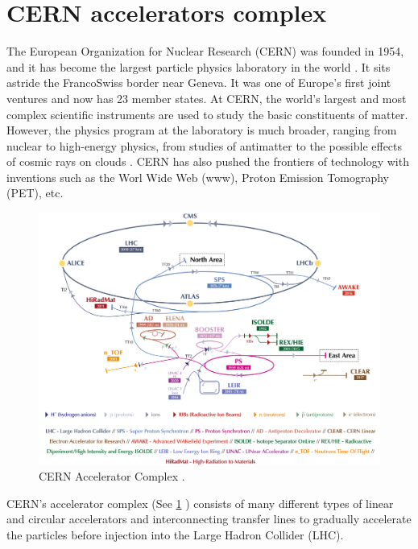 \pagestyle{fancy}

\graphicspath{ {Figures/Chapter1_Overview/} }

\section{CERN accelerators complex}
\label{sec:CERN_acc_complex}

The European Organization for Nuclear Research (CERN) was founded in 1954, and it has become the largest particle physics laboratory in the world \parencite*[][]{ref:CernWebsite}. It sits astride the FrancoSwiss border near Geneva. It was one of Europe's first joint ventures and now has 23 member states. At CERN, the world's largest and most complex scientific instruments are used to study the basic constituents of matter. However, the physics program at the laboratory is much broader, ranging from nuclear to high-energy physics, from studies of antimatter to the possible effects of cosmic rays on clouds \parencite[][]{ref:PhysProgramCern}. CERN has also pushed the frontiers of technology with inventions such as the Worl Wide Web (www), Proton Emission Tomography (PET), etc.  

\begin{figure}[h]
    \centering
    \includegraphics[width=0.9\columnwidth]{Figure_AcceleratorChain/cernComplex.png}
    \caption{CERN Accelerator Complex \parencite*[][]{ref:cerncomplex} . }
    \label{fig:AccComplex}
\end{figure}

CERN's accelerator complex (See \ref{fig:AccComplex} ) consists of many different types of linear and circular accelerators and interconnecting transfer lines to gradually accelerate the particles before injection into the Large Hadron Collider (LHC). 


